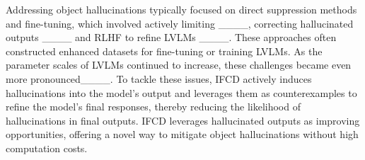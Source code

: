 Addressing object hallucinations typically focused on direct suppression methods and fine-tuning, which involved actively limiting ____, correcting hallucinated outputs ____ and RLHF to refine LVLMs ____. These approaches often constructed enhanced datasets for fine-tuning or training LVLMs. As the parameter scales of LVLMs continued to increase, these challenges became even more pronounced____. To tackle these issues, IFCD actively induces hallucinations into the model's output and leverages them as counterexamples to refine the model's final responses, thereby reducing the likelihood of hallucinations in final outputs. IFCD leverages hallucinated outputs as improving opportunities, offering a novel way to mitigate object hallucinations without high computation costs.